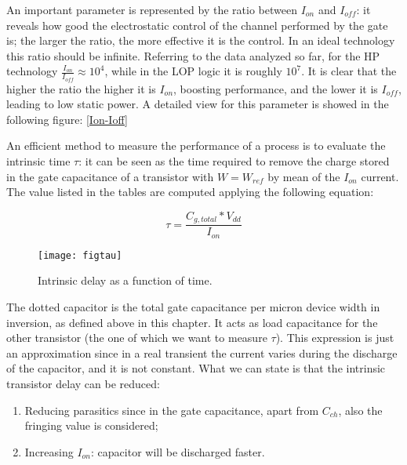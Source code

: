\documentclass[a4paper, 12pt, twoside, openright]{report}
\begin{document}
An important parameter is represented by the ratio between $I_{on}$ and $I_{off}$: it reveals how good the electrostatic control of the channel performed by the gate is; the larger the ratio, the more effective it is the control. In an ideal technology this ratio should be infinite. Referring to the data analyzed so far, for the HP technology $\frac{I_{on}}{I_{off}} \approx 10^4$, while in the LOP logic it is roughly $10^7$. It is clear that the higher the ratio the higher it is $I_{on}$, boosting performance, and the lower it is $I_{off}$, leading to low static power. A detailed view for this parameter is showed in the following figure: \ref{Ion-Ioff}


An efficient method to measure the performance of a process is to evaluate the intrinsic time $\tau$: it can be seen as the time required to remove the charge stored in the gate capacitance of a transistor with $W=W_{ref}$ by mean of the $I_{on}$ current.
The value listed in the tables are computed applying the following equation:

\begin{equation}
\tau = \frac{C_{g,total}*V_{dd}}{I_{on}}
\label{}
\end{equation}

	\begin{figure}[h]
	\centering
	\texttt{[image: figtau]}
	\caption{Intrinsic delay as a function of time.}
	\label{tau}
	\end{figure}

The dotted capacitor is the total gate capacitance per micron device width in inversion, as defined above in this chapter. It acts as load capacitance for the other transistor (the one of which we want to measure $\tau$). This expression is just an approximation since in a real transient the current varies during the discharge of the capacitor, and it is not constant. What we can state is that the intrinsic transistor delay can be reduced:

	\begin{enumerate}
		\item Reducing parasitics since in the gate capacitance, apart from $C_{ch}$, also the fringing value is considered;
		\item Increasing $I_{on}$: capacitor will be discharged faster.
	\end{enumerate}
\end{document}

